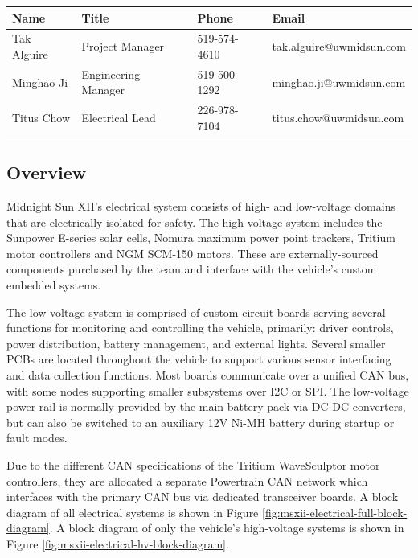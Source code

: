 \documentclass[10pt]{article}
\begin{document}
\begin{table}[!h]
\centering
\begin{tabular}{llll}
\toprule
Name        & Title               & Phone        & Email \\
\midrule
Tak Alguire & Project Manager     & 519-574-4610 & tak.alguire@uwmidsun.com \\
Minghao Ji  & Engineering Manager & 519-500-1292 & minghao.ji@uwmidsun.com \\
Titus Chow  & Electrical Lead     & 226-978-7104 & titus.chow@uwmidsun.com \\
\bottomrule
\end{tabular}
\end{table}

\subsection{Overview}
Midnight Sun XII's electrical system consists of high- and low-voltage domains that are electrically isolated for safety. The high-voltage system includes the Sunpower E-series solar cells, Nomura maximum power point trackers, Tritium motor controllers and NGM SCM-150 motors. These are externally-sourced components purchased by the team and interface with the vehicle's custom embedded systems.

The low-voltage system is comprised of custom circuit-boards serving several functions for monitoring and controlling the vehicle, primarily: driver controls, power distribution, battery management, and external lights. Several smaller PCBs are located throughout the vehicle to support various sensor interfacing and data collection functions. Most boards communicate over a unified CAN bus, with some nodes supporting smaller subsystems over I2C or SPI. The low-voltage power rail is normally provided by the main battery pack via DC-DC converters, but can also be switched to an auxiliary 12V Ni-MH battery during startup or fault modes.

Due to the different CAN specifications of the Tritium WaveSculptor motor controllers, they are allocated a separate Powertrain CAN network which interfaces with the primary CAN bus via dedicated transceiver boards. A block diagram of all electrical systems is shown in Figure \ref{fig:msxii-electrical-full-block-diagram}. A block diagram of only the vehicle's high-voltage systems is shown in Figure \ref{fig:msxii-electrical-hv-block-diagram}.
\end{document}
